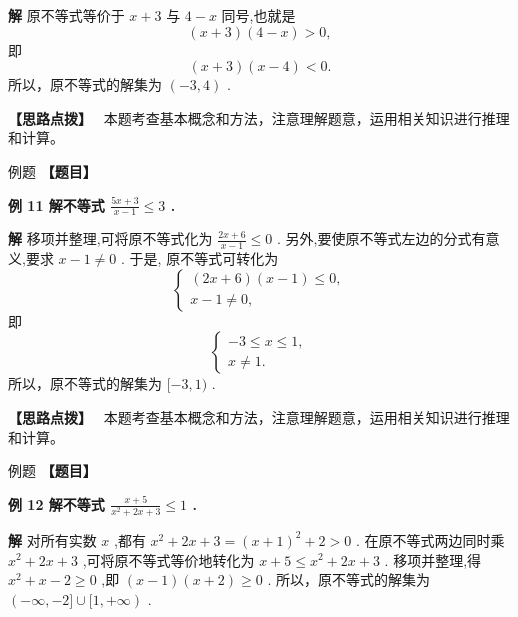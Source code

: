 \documentclass[a4paper,10pt,oneside,fontset=none]{ctexbook}
\renewcommand{\geq}{\geqslant}
\renewcommand{\leq}{\leqslant}
\newcounter{example}[chapter]
\newenvironment{example}[1][]{\begin{exBox}{例题}{#1}}{\end{exBox}}
\numberwithin{equation}{chapter}
\newenvironment{solution}{\begin{solutionBox}}{\end{solutionBox}}
\newenvironment{hint}{\begin{hintBox}\textbf{【思路点拨】}~}{\end{hintBox}}
\begin{document}
\begin{solution}
\textbf{解}
原不等式等价于 $x + 3$ 与 $4 - x$ 同号,也就是
$$
\left( {x + 3}\right) \left( {4 - x}\right)  > 0,
$$
即
$$
\left( {x + 3}\right) \left( {x - 4}\right)  < 0.
$$
所以，原不等式的解集为 $\left( {-3,4}\right)$ .
\end{solution}

\begin{hint}
本题考查基本概念和方法，注意理解题意，运用相关知识进行推理和计算。
\end{hint}

\begin{example}
\textbf{【题目】}\par\vspace{0.3em}
\textbf{例 11 解不等式 $\frac{{5x} + 3}{x - 1} \leq  3$ .}\par\vspace{0.3em}
\end{example}

\begin{solution}
\textbf{解}
移项并整理,可将原不等式化为 $\frac{{2x} + 6}{x - 1} \leq  0$ .
另外,要使原不等式左边的分式有意义,要求 $x - 1 \neq  0$ .
于是, 原不等式可转化为
$$
\left\{  \begin{array}{l} \left( {{2x} + 6}\right) \left( {x - 1}\right)  \leq  0, \\  x - 1 \neq  0, \end{array}\right.
$$
即
$$
\left\{  \begin{array}{l}  - 3 \leq  x \leq  1, \\  x \neq  1. \end{array}\right.
$$
所以，原不等式的解集为 $\lbrack  - 3,1)$ .
\end{solution}

\begin{hint}
本题考查基本概念和方法，注意理解题意，运用相关知识进行推理和计算。
\end{hint}

\begin{example}
\textbf{【题目】}\par\vspace{0.3em}
\textbf{例 12 解不等式 $\frac{x + 5}{{x}^{2} + {2x} + 3} \leq  1$ .}\par\vspace{0.3em}
\end{example}

\begin{solution}
\textbf{解}
对所有实数 $x$ ,都有 ${x}^{2} + {2x} + 3 = {\left( x + 1\right) }^{2} + 2 > 0$ . 在原不等式两边同时乘 ${x}^{2} + {2x} + 3$ ,可将原不等式等价地转化为 $x + 5 \leq  {x}^{2} + {2x} + 3$ .
移项并整理,得 ${x}^{2} + x - 2 \geq  0$ ,即 $\left( {x - 1}\right) \left( {x + 2}\right)  \geq  0$ .
所以，原不等式的解集为 $\left( {-\infty , - 2\rbrack \cup \lbrack 1, + \infty }\right)$ .
\end{solution}
\end{document}
